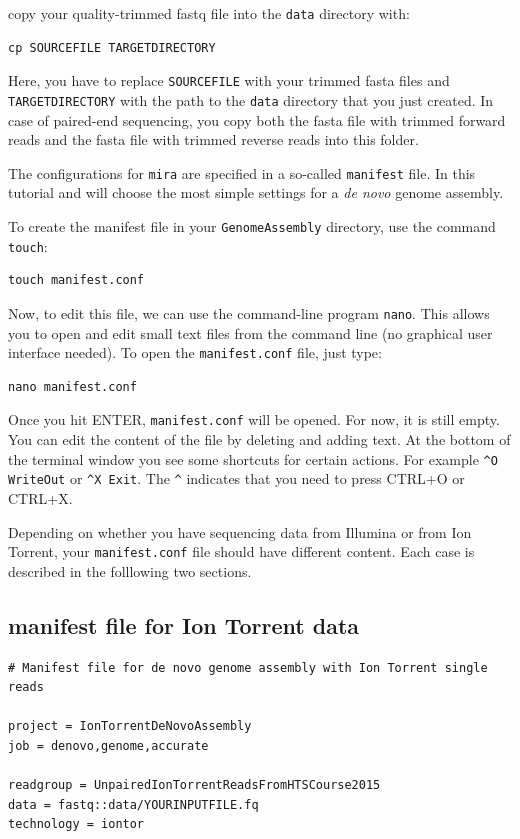 \documentclass[11pt]{article}
\begin{document}
copy your quality-trimmed fastq file into the \texttt{data} directory with:

\begin{verbatim}
cp SOURCEFILE TARGETDIRECTORY
\end{verbatim}

Here, you have to replace \texttt{SOURCEFILE} with your trimmed fasta files
and \texttt{TARGETDIRECTORY} with the path to the \texttt{data} directory that you just created.
In case of paired-end sequencing, you copy both the fasta file with
trimmed forward reads and the fasta file with trimmed reverse reads
into this folder.



The configurations for \texttt{mira} are specified in a so-called \texttt{manifest}
file. In this tutorial and will choose the most simple settings for a
\emph{de novo} genome assembly.




To create the manifest file in your \texttt{GenomeAssembly} directory, use
the command \texttt{touch}:

\begin{verbatim}
touch manifest.conf
\end{verbatim}

Now, to edit this file, we can use the command-line program
\texttt{nano}. This allows you to open and edit small text files from the command
line (no graphical user interface needed). To open the \texttt{manifest.conf}
file, just type:

\begin{verbatim}
nano manifest.conf
\end{verbatim}

Once you hit ENTER, \texttt{manifest.conf} will be opened. For now, it is
still empty. You can edit the content of the file by deleting and
adding text. At the bottom of the terminal window you see some
shortcuts for certain actions. For example \texttt{\textasciicircum{}O WriteOut} or 
\texttt{\textasciicircum{}X Exit}. The \texttt{\textasciicircum{}} indicates that you need to press CTRL+O or CTRL+X.

Depending on whether you have sequencing data from Illumina or from
Ion Torrent, your \texttt{manifest.conf} file should have different
content. Each case is described in the folllowing two sections.

\subsection{manifest file for Ion Torrent data}
\label{sec-1-1}
\begin{verbatim}
# Manifest file for de novo genome assembly with Ion Torrent single reads

project = IonTorrentDeNovoAssembly
job = denovo,genome,accurate

readgroup = UnpairedIonTorrentReadsFromHTSCourse2015
data = fastq::data/YOURINPUTFILE.fq
technology = iontor
\end{verbatim}
\end{document}
